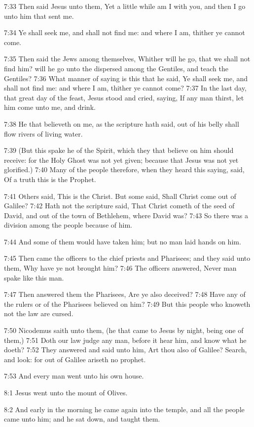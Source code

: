 7:33 Then said Jesus unto them, Yet a little while am I with you, and then I go unto him that sent me.

7:34 Ye shall seek me, and shall not find me: and where I am, thither ye cannot come.

7:35 Then said the Jews among themselves, Whither will he go, that we shall not find him? will he go unto the dispersed among the Gentiles, and teach the Gentiles?  7:36 What manner of saying is this that he said, Ye shall seek me, and shall not find me: and where I am, thither ye cannot come?  7:37 In the last day, that great day of the feast, Jesus stood and cried, saying, If any man thirst, let him come unto me, and drink.

7:38 He that believeth on me, as the scripture hath said, out of his belly shall flow rivers of living water.

7:39 (But this spake he of the Spirit, which they that believe on him should receive: for the Holy Ghost was not yet given; because that Jesus was not yet glorified.)  7:40 Many of the people therefore, when they heard this saying, said, Of a truth this is the Prophet.

7:41 Others said, This is the Christ. But some said, Shall Christ come out of Galilee?  7:42 Hath not the scripture said, That Christ cometh of the seed of David, and out of the town of Bethlehem, where David was?  7:43 So there was a division among the people because of him.

7:44 And some of them would have taken him; but no man laid hands on him.

7:45 Then came the officers to the chief priests and Pharisees; and they said unto them, Why have ye not brought him?  7:46 The officers answered, Never man spake like this man.

7:47 Then answered them the Pharisees, Are ye also deceived?  7:48 Have any of the rulers or of the Pharisees believed on him?  7:49 But this people who knoweth not the law are cursed.

7:50 Nicodemus saith unto them, (he that came to Jesus by night, being one of them,) 7:51 Doth our law judge any man, before it hear him, and know what he doeth?  7:52 They answered and said unto him, Art thou also of Galilee?  Search, and look: for out of Galilee ariseth no prophet.

7:53 And every man went unto his own house.

8:1 Jesus went unto the mount of Olives.

8:2 And early in the morning he came again into the temple, and all the people came unto him; and he sat down, and taught them.

